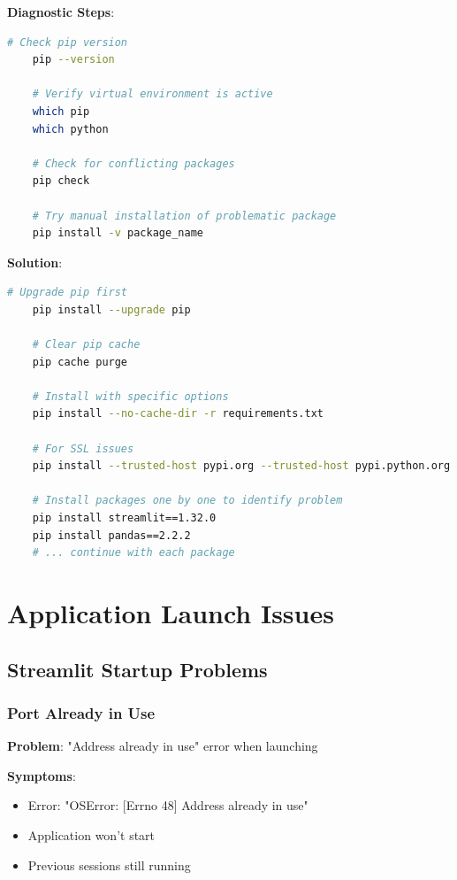 \textbf{Diagnostic Steps}:
\begin{lstlisting}[language=bash,basicstyle=\color{blue}]
	# Check pip version
	pip --version
	
	# Verify virtual environment is active
	which pip
	which python
	
	# Check for conflicting packages
	pip check
	
	# Try manual installation of problematic package
	pip install -v package_name
\end{lstlisting}

\textbf{Solution}:
\begin{lstlisting}[language=bash,basicstyle=\color{blue}]
	# Upgrade pip first
	pip install --upgrade pip
	
	# Clear pip cache
	pip cache purge
	
	# Install with specific options
	pip install --no-cache-dir -r requirements.txt
	
	# For SSL issues
	pip install --trusted-host pypi.org --trusted-host pypi.python.org -r requirements.txt
	
	# Install packages one by one to identify problem
	pip install streamlit==1.32.0
	pip install pandas==2.2.2
	# ... continue with each package
\end{lstlisting}


\section{Application Launch Issues}

\subsection{Streamlit Startup Problems}

\subsubsection{Port Already in Use}

\textbf{Problem}: "Address already in use" error when launching

\textbf{Symptoms}:
\begin{itemize}
	\item Error: "OSError: [Errno 48] Address already in use"
	\item Application won't start
	\item Previous sessions still running
\end{itemize}

